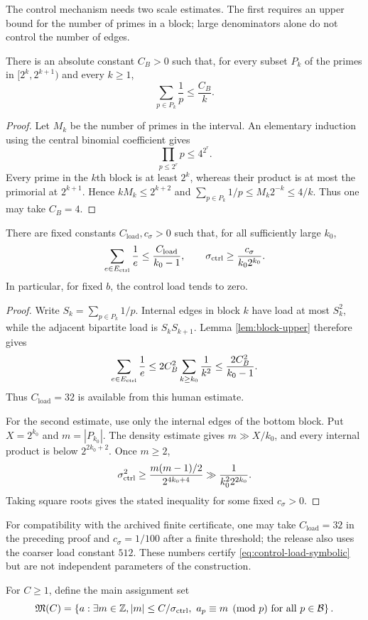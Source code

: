 The control mechanism needs two scale estimates.  The first requires an upper
bound for the number of primes in a block; large denominators alone do not
control the number of edges.

\begin{lemma}\label{lem:block-upper}
There is an absolute constant $C_B>0$ such that, for every subset $P_k$ of the
primes in $[2^k,2^{k+1})$ and every $k\ge1$,
\begin{equation}\label{eq:block-recip-upper}
 \sum_{p\in P_k}\frac1p\le\frac{C_B}{k}.
\end{equation}
\end{lemma}
\begin{proof}
Let $M_k$ be the number of primes in the interval.  An elementary induction
using the central binomial coefficient gives
\[
 \prod_{p\le2^r}p\le4^{2^r}.
\]
Every prime in the $k$th block is at least $2^k$, whereas their product is at
most the primorial at $2^{k+1}$.  Hence $kM_k\le2^{k+2}$ and
$\sum_{p\in P_k}1/p\le M_k2^{-k}\le4/k$.  Thus one may take $C_B=4$.
\end{proof}

\begin{proposition}\label{prop:control-estimates}
There are fixed constants $C_{\mathrm{load}},c_\sigma>0$ such that, for all
sufficiently large $k_0$,
\begin{equation}\label{eq:control-load-symbolic}
 \sum_{e\in E_{\mathrm{ctrl}}}\frac1e
 \le\frac{C_{\mathrm{load}}}{k_0-1},
 \qquad
 \sigma_{\mathrm{ctrl}}\ge\frac{c_\sigma}{k_0 2^{k_0}}.
\end{equation}
In particular, for fixed $b$, the control load tends to zero.
\end{proposition}
\begin{proof}
Write $S_k=\sum_{p\in P_k}1/p$.  Internal edges in block $k$ have load at most
$S_k^2$, while the adjacent bipartite load is $S_kS_{k+1}$.  Lemma
\ref{lem:block-upper} therefore gives
\[
 \sum_{e\in E_{\mathrm{ctrl}}}\frac1e
 \le2C_B^2\sum_{k\ge k_0}\frac1{k^2}
 \le\frac{2C_B^2}{k_0-1}.
\]
Thus $C_{\mathrm{load}}=32$ is available from this human estimate.

For the second estimate, use only the internal edges of the bottom block.  Put
$X=2^{k_0}$ and $m=|P_{k_0}|$.  The density estimate gives
$m\gg X/k_0$, and every internal product is below $2^{2k_0+2}$.  Once $m\ge2$,
\[
 \sigma_{\mathrm{ctrl}}^2
 \ge\frac{m(m-1)/2}{2^{4k_0+4}}
 \gg\frac1{k_0^2 2^{2k_0}}.
\]
Taking square roots gives the stated inequality for some fixed $c_\sigma>0$.
\end{proof}

For compatibility with the archived finite certificate, one may take
$C_{\mathrm{load}}=32$ in the preceding proof and $c_\sigma=1/100$ after a
finite threshold; the release also uses the coarser load constant $512$.  These
numbers certify \eqref{eq:control-load-symbolic} but are not independent
parameters of the construction.

For $C\ge1$, define the main assignment set
\begin{equation}\label{eq:assignment-main}
 \mathfrak M(C)=
 \left\{a:\exists m\in\mathbb Z,
 |m|\le C/\sigma_{\mathrm{ctrl}},
 \ a_p\equiv m\pmod p\text{ for all }p\in\mathcal B\right\}.
\end{equation}
